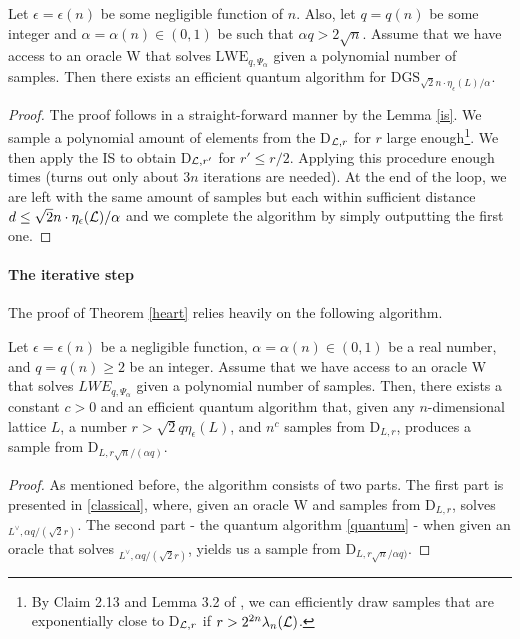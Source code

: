 \begin{theorem}\label{heart}
	Let $\epsilon = \epsilon(n)$ be some negligible function of $n$. Also, let $q = q(n)$ be some integer and $\alpha = \alpha(n) \in (0, 1)$ be such that $\alpha q > 2\sqrt{n}$. Assume that we have access to an oracle W that solves $\text{LWE}_{q,\Psi_{\alpha}}$ given a polynomial number of samples. Then there exists an efficient quantum algorithm for $\text{DGS}_{\sqrt{2}n \cdot \eta_{\epsilon}(L)/\alpha}$.
\end{theorem}
\begin{proof}
	The proof follows in a straight-forward manner by the Lemma \ref{is}. We sample a polynomial amount of elements from the D$_{\mathcal{L}, r}$ for $r$ large enough\footnote{By Claim 2.13 and Lemma 3.2 of \cite{regev}, we can efficiently draw samples that are exponentially close to D$_{\mathcal{L}, r}$ if $r > 2^{2n} \lambda_n(\mathcal{L})$.}. We then apply the IS to obtain D$_{\mathcal{L}, r'}$ for $r' \leq r/2$. Applying this procedure enough times (turns out only about $3n$ iterations are needed). At the end of the loop, we are left with the same amount of samples but each within sufficient distance $d \leq \sqrt{2}n \cdot \eta_{\epsilon}(\mathcal{L})/\alpha$ and we complete the algorithm by simply outputting the first one.
\end{proof}

\paragraph{The iterative step}
The proof of Theorem \ref{heart} relies heavily on the following algorithm. 
\begin{lemma}\label{is}
	Let $\epsilon = \epsilon(n)$ be a negligible function, $\alpha = \alpha(n) \in (0, 1)$ be a real number, and $q = q(n) \geq 2$ be an integer. Assume that we have access to an oracle W that solves $LWE_{q,\Psi_{\alpha}}$ given a polynomial number of samples. Then, there exists a constant $c > 0$ and an efficient quantum algorithm that, given any $n$-dimensional lattice $L$, a number $r > \sqrt{2}q \eta_{\epsilon}(L)$, and $n^c$ samples from $\text{D}_{L,r}$, produces a sample from $\text{D}_{L,r\sqrt{n}/(\alpha q)}$.
\end{lemma}
\begin{proof}
	As mentioned before, the algorithm consists of two parts. The first part is presented in \ref{classical}, where, given an oracle W and samples from $\text{D}_{L,r}$, solves $_{L^{\vee}, \alpha q / (\sqrt{2} r)}$. The second part - the quantum algorithm \ref{quantum} - when given an oracle that solves $_{L^{\vee}, \alpha q / (\sqrt{2} r)}$, yields us a sample from $\text{D}_{L, r\sqrt{n}/\alpha q)}$.
\end{proof}

